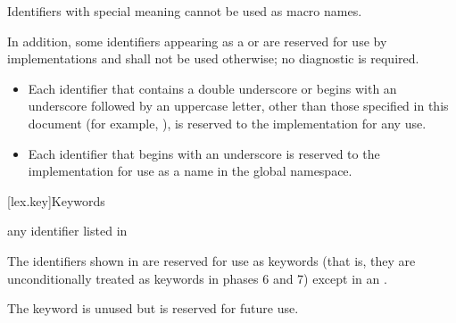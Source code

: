 \pnum
\begin{note}
Identifiers with special meaning
cannot be used as macro names.
\end{note}

\pnum
{}%
%
%
In addition, some identifiers
appearing as a  or 
are reserved for use by \Cpp{}
implementations and shall
not be used otherwise; no diagnostic is required.
\begin{itemize}
\item
Each identifier that contains a double underscore
\tcode{\unun}
%
or begins with an underscore followed by
an uppercase letter,
other than those specified in this document
(for example, ),
%
is reserved to the implementation for any use.
\item
Each identifier that begins with an underscore is
%
reserved to the implementation for use as a name in the global namespace.%
\end{itemize}%

[lex.key]{Keywords}

\begin{bnf}
\br
    \textnormal{any identifier listed in }\br
    \br
    \br
\end{bnf}

\pnum
{}%
The identifiers shown in  are reserved for use
as keywords (that is, they are unconditionally treated as keywords in
phases 6 and 7) except in an .
\begin{note}
The  keyword is unused but
is reserved for future use.
\end{note}

